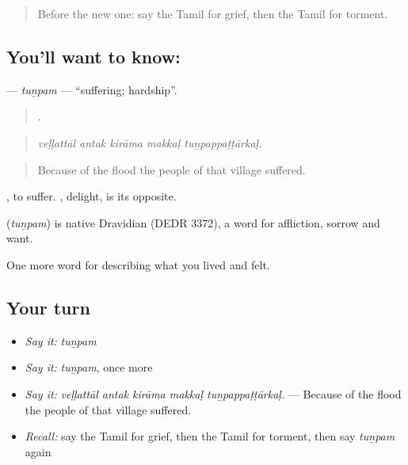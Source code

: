 \label{lesson:TA-C463-tunpam}



\begin{quote}
Before the new one: say the Tamil for grief, then the Tamil for torment.
\end{quote}

\subsection*{You'll want to know: }
\textbf{} — \emph{tuṉpam} — \textquotedblleft{}suffering; hardship\textquotedblright{}.

\begin{quote}
    .
\end{quote}

\begin{quote}
\emph{veḷḷattāl antak kirāma makkaḷ tuṉpappaṭṭārkaḷ.}
\end{quote}

\begin{quote}
Because of the flood the people of that village suffered.
\end{quote}

, to suffer. , delight, is its opposite.

\begin{cousinweb}
\textbf{} (\emph{tuṉpam}) is native Dravidian (DEDR 3372), a word for affliction, sorrow and want.
\end{cousinweb}

\begin{grammarlens}[title={What you've built}]
One more word for describing what you lived and felt.
\end{grammarlens}

\subsection*{Your turn}
\begin{itemize}
\raggedright
  \item \emph{Say it:} \emph{tuṉpam}
  \item \emph{Say it:} \emph{tuṉpam}, once more
  \item \emph{Say it:} \emph{veḷḷattāl antak kirāma makkaḷ tuṉpappaṭṭārkaḷ.} — Because of the flood the people of that village suffered.
  \item \emph{Recall:} say the Tamil for grief, then the Tamil for torment, then say \emph{tuṉpam} again
\end{itemize}

